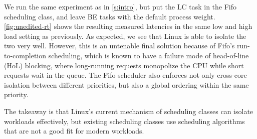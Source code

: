 We run the same experiment as in \autoref{s:intro}, but put the LC task in the
Fifo scheduling class, and leave BE tasks with the default process weight.
\autoref{fig:unedited-rt} shows the resulting measured latencies in the same low
and high load setting as previously. As expected, we see that Linux is able to
isolate the two very well. However, this is an untenable final solution because
of Fifo's run-to-completion scheduling, which is known to have a failure mode of
head-of-line (HoL) blocking, where long-running requests monopolize the CPU
while short requests wait in the queue. The Fifo scheduler also enforces not
only cross-core isolation between different priorities, but also a global
ordering within the same priority.

The takeaway is that Linux's current mechanism of scheduling classes can isolate
workloads effectively, but existing scheduling classes use scheduling
algorithms that are not a good fit for modern workloads.



